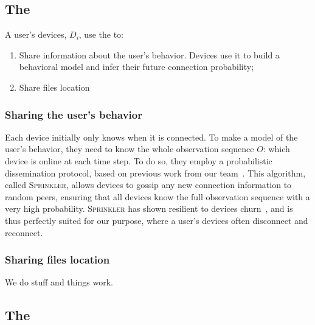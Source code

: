 \subsection{The \localoverlay}%
\label{local-overlay}

A user's devices, \(D_i\), use the \localoverlay to:
\begin{enumerate}
	\item Share information about the user's behavior.
	Devices use it to build a behavioral model and infer their future connection probability;
  \item Share files location 
\end{enumerate}

\subsubsection{Sharing the user's behavior}%
\label{ssub:sharing_the_user_s_behavior}

Each device initially only knows when it is connected. 
To make a model of the user's behavior, they need to know the whole observation sequence $O$: which device is online at each time step.
To do so, they employ a probabilistic dissemination protocol, based on previous work from our team~\cite{luxey:hal-01704172}.
This algorithm, called \textsc{Sprinkler}, allows devices to gossip any new connection information to random peers, ensuring that all devices know the full observation sequence with a very high probability.
\textsc{Sprinkler} has shown resilient to devices churn~\cite{luxey:cascade}, and is thus perfectly suited for our purpose, where a user's devices often disconnect and reconnect. 




\subsubsection{Sharing files location}%
\label{ssub:sharing_files_location}

We do stuff and things work.


\subsection{The \globaloverlay}%
\label{global-overlay}

